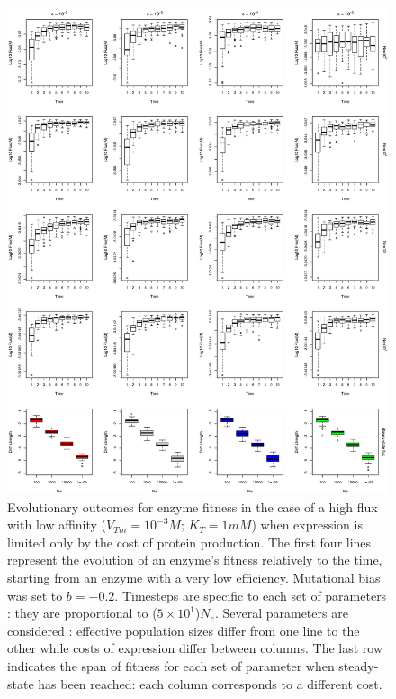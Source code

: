 \begin{figure}[H]
\vspace{-0.5cm}
\begin{center}
\includegraphics[scale=0.5,trim=0cm 0cm 0cm 0cm,clip]{pics/SM-Enzymes/Evo_SteadyState_ConcCost_HighF.jpeg} 
\vspace{-0.1cm}
\caption{\small Evolutionary outcomes for enzyme fitness in the case of a high flux with low affinity ($V_{Tm}=10^{-3}M$; $K_T=1 mM$) when expression is limited only by the cost of protein production. The first four lines represent the evolution of an enzyme's fitness relatively to the time, starting from an enzyme with a very low efficiency. Mutational bias was set to $b=-0.2$. Timesteps are specific to each set of parameters : they are proportional to ($5\times 10^1$)$N_e$. Several parameters are considered : effective population sizes differ from one line to the other while costs of expression differ between columns. The last row indicates the span of fitness for each set of parameter when steady-state has been reached: each column corresponds to a different cost.\normalsize}
\label{fig8c-ann}
\end{center}
\end{figure}

